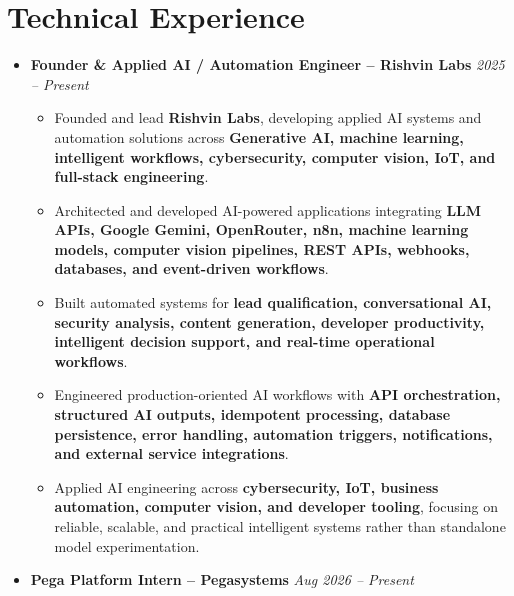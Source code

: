 \documentclass[a4paper,11pt]{article}
\newcommand{\resumeItem}[1]{
    \item \small{#1 \vspace{-2pt}}
}
\begin{document}
\vspace{-10pt}


\section{Technical Experience}

\begin{itemize}[leftmargin=0in, label={}]

\item
\textbf{Founder \& Applied AI / Automation Engineer -- Rishvin Labs}
\hfill \textit{2025 -- Present}

\begin{itemize}[leftmargin=*]

\resumeItem{Founded and lead \textbf{Rishvin Labs}, developing applied AI systems and automation solutions across \textbf{Generative AI, machine learning, intelligent workflows, cybersecurity, computer vision, IoT, and full-stack engineering}.}

\resumeItem{Architected and developed AI-powered applications integrating \textbf{LLM APIs, Google Gemini, OpenRouter, n8n, machine learning models, computer vision pipelines, REST APIs, webhooks, databases, and event-driven workflows}.}

\resumeItem{Built automated systems for \textbf{lead qualification, conversational AI, security analysis, content generation, developer productivity, intelligent decision support, and real-time operational workflows}.}

\resumeItem{Engineered production-oriented AI workflows with \textbf{API orchestration, structured AI outputs, idempotent processing, database persistence, error handling, automation triggers, notifications, and external service integrations}.}

\resumeItem{Applied AI engineering across \textbf{cybersecurity, IoT, business automation, computer vision, and developer tooling}, focusing on reliable, scalable, and practical intelligent systems rather than standalone model experimentation.}

\end{itemize}

\vspace{4pt}

\item
\textbf{Pega Platform Intern -- Pegasystems}
\hfill \textit{Aug 2026 -- Present}


\end{itemize}
\end{document}
